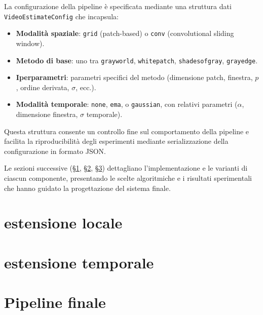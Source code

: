 La configurazione della pipeline è specificata mediante una struttura dati \texttt{VideoEstimateConfig} che incapsula:
\begin{itemize}
    \item \textbf{Modalità spaziale}: \texttt{grid} (patch-based) o \texttt{conv} (convolutional sliding window).
    \item \textbf{Metodo di base}: uno tra \texttt{grayworld}, \texttt{whitepatch}, \texttt{shadesofgray}, \texttt{grayedge}.
    \item \textbf{Iperparametri}: parametri specifici del metodo (dimensione patch, finestra, $p$, ordine derivata, $\sigma$, ecc.).
    \item \textbf{Modalità temporale}: \texttt{none}, \texttt{ema}, o \texttt{gaussian}, con relativi parametri ($\alpha$, dimensione finestra, $\sigma$ temporale).
\end{itemize}

Questa struttura consente un controllo fine sul comportamento della pipeline e facilita la riproducibilità degli esperimenti mediante serializzazione della configurazione in formato JSON.

Le sezioni successive (\S\ref{sec:estensione_locale}, \S\ref{sec:estensione_temporale}, \S\ref{sec:pipeline_finale}) dettagliano l'implementazione e le varianti di ciascun componente, presentando le scelte algoritmiche e i risultati sperimentali che hanno guidato la progettazione del sistema finale.


\section{estensione locale}\label{sec:estensione_locale} %


\section{estensione temporale}\label{sec:estensione_temporale} %


\section{Pipeline finale}\label{sec:pipeline_finale} %

